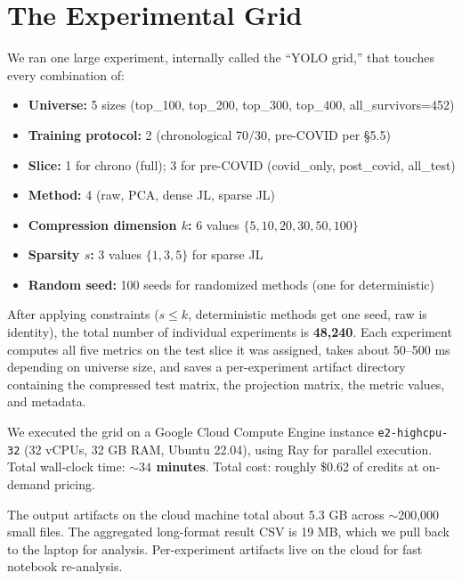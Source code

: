 \documentclass[11pt]{article}
\begin{document}
\newpage

\section{The Experimental Grid}

We ran one large experiment, internally called the ``YOLO grid,'' that touches every combination of:

\begin{itemize}
    \item \textbf{Universe:} 5 sizes (top\_100, top\_200, top\_300, top\_400, all\_survivors=452)
    \item \textbf{Training protocol:} 2 (chronological 70/30, pre-COVID per §5.5)
    \item \textbf{Slice:} 1 for chrono (full); 3 for pre-COVID (covid\_only, post\_covid, all\_test)
    \item \textbf{Method:} 4 (raw, PCA, dense JL, sparse JL)
    \item \textbf{Compression dimension $k$:} 6 values $\{5, 10, 20, 30, 50, 100\}$
    \item \textbf{Sparsity $s$:} 3 values $\{1, 3, 5\}$ for sparse JL
    \item \textbf{Random seed:} 100 seeds for randomized methods (one for deterministic)
\end{itemize}

After applying constraints ($s \le k$, deterministic methods get one seed, raw is identity), the total number of individual experiments is \textbf{48{,}240}. Each experiment computes all five metrics on the test slice it was assigned, takes about 50--500 ms depending on universe size, and saves a per-experiment artifact directory containing the compressed test matrix, the projection matrix, the metric values, and metadata.

We executed the grid on a Google Cloud Compute Engine instance \texttt{e2-highcpu-32} (32 vCPUs, 32 GB RAM, Ubuntu 22.04), using Ray for parallel execution. Total wall-clock time: \textbf{$\sim 34$ minutes}. Total cost: roughly \$0.62 of credits at on-demand pricing.

The output artifacts on the cloud machine total about 5.3 GB across $\sim$200{,}000 small files. The aggregated long-format result CSV is 19 MB, which we pull back to the laptop for analysis. Per-experiment artifacts live on the cloud for fast notebook re-analysis.

\newpage
\end{document}
